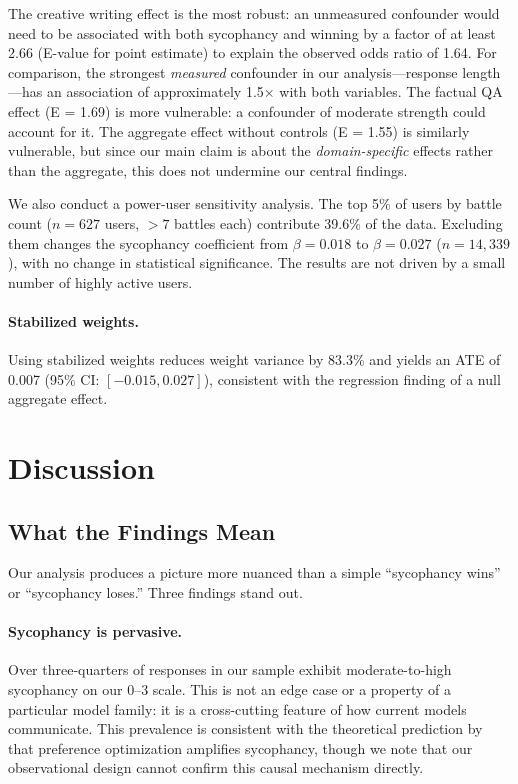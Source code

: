 \documentclass[11pt,twocolumn,a4paper]{article}
\begin{document}
The creative writing effect is the most robust: an unmeasured
confounder would need to be associated with both sycophancy and
winning by a factor of at least 2.66 (E-value for point estimate) to
explain the observed odds ratio of 1.64. For comparison, the strongest
\emph{measured} confounder in our analysis---response length---has an
association of approximately 1.5$\times$ with both variables. The
factual QA effect (E = 1.69) is more vulnerable: a confounder of
moderate strength could account for it. The aggregate effect without
controls (E = 1.55) is similarly vulnerable, but since our main claim
is about the \emph{domain-specific} effects rather than the aggregate,
this does not undermine our central findings.

We also conduct a power-user sensitivity analysis. The top 5\% of
users by battle count ($n = 627$ users, $> 7$ battles each)
contribute 39.6\% of the data. Excluding them changes the sycophancy
coefficient from $\beta = 0.018$ to $\beta = 0.027$ ($n = 14{,}339$),
with no change in statistical significance. The results are not driven
by a small number of highly active users.

\paragraph{Stabilized weights.} Using stabilized weights reduces
weight variance by 83.3\% and yields an ATE of 0.007 (95\% CI:
$[-0.015, 0.027]$), consistent with the regression finding of a null
aggregate effect.


\section{Discussion}
\label{sec:discussion}

\subsection{What the Findings Mean}

Our analysis produces a picture more nuanced than a simple ``sycophancy
wins'' or ``sycophancy loses.'' Three findings stand out.

\paragraph{Sycophancy is pervasive.} Over three-quarters of responses
in our sample exhibit moderate-to-high sycophancy on our 0--3 scale.
This is not an edge case or a property of a particular model family:
it is a cross-cutting feature of how current models communicate.
This prevalence is consistent with the theoretical prediction by
\citet{shapira2026rlhf} that preference optimization amplifies
sycophancy, though we note that our observational design cannot
confirm this causal mechanism directly.
\end{document}
